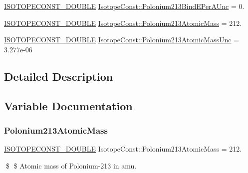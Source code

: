 \begin{DoxyCompactItemize}
\mbox{\hyperlink{group___isotope_const-_macros_ga8f45a7272ce02c0b4c65c44636ed719a}{I\+S\+O\+T\+O\+P\+E\+C\+O\+N\+S\+T\+\_\+\+D\+O\+U\+B\+LE}} \mbox{\hyperlink{group___isotope_const-_polonium-_po213_ga17538201b360d711a358ad75ff0876ad}{Isotope\+Const\+::\+Polonium213\+Bind\+E\+Per\+A\+Unc}} = 0.
\item 
\mbox{\hyperlink{group___isotope_const-_macros_ga8f45a7272ce02c0b4c65c44636ed719a}{I\+S\+O\+T\+O\+P\+E\+C\+O\+N\+S\+T\+\_\+\+D\+O\+U\+B\+LE}} \mbox{\hyperlink{group___isotope_const-_polonium-_po213_ga284d21cc8dfc791ecd5cd0f0156f94f5}{Isotope\+Const\+::\+Polonium213\+Atomic\+Mass}} = 212.
\item 
\mbox{\hyperlink{group___isotope_const-_macros_ga8f45a7272ce02c0b4c65c44636ed719a}{I\+S\+O\+T\+O\+P\+E\+C\+O\+N\+S\+T\+\_\+\+D\+O\+U\+B\+LE}} \mbox{\hyperlink{group___isotope_const-_polonium-_po213_gae9c22fd934651014b25b244ac929b543}{Isotope\+Const\+::\+Polonium213\+Atomic\+Mass\+Unc}} = 3.\+277e-\/06
\end{DoxyCompactItemize}


\subsection{Detailed Description}


\subsection{Variable Documentation}
\mbox{\label{group___isotope_const-_polonium-_po213_ga284d21cc8dfc791ecd5cd0f0156f94f5}} 
\subsubsection{\texorpdfstring{Polonium213\+Atomic\+Mass}{Polonium213AtomicMass}}
{\footnotesize\ttfamily \mbox{\hyperlink{group___isotope_const-_macros_ga8f45a7272ce02c0b4c65c44636ed719a}{I\+S\+O\+T\+O\+P\+E\+C\+O\+N\+S\+T\+\_\+\+D\+O\+U\+B\+LE}} Isotope\+Const\+::\+Polonium213\+Atomic\+Mass = 212.}

\$ \$ Atomic mass of Polonium-\/213 in amu. \mbox{\label{group___isotope_const-_polonium-_po213_gae9c22fd934651014b25b244ac929b543}} 
